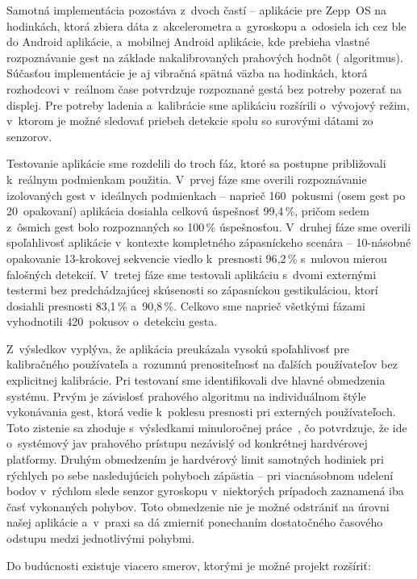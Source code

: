 Samotná implementácia pozostáva z~dvoch častí -- aplikácie
pre Zepp~OS na hodinkách, ktorá zbiera dáta z~akcelerometra
a~gyroskopu a~odosiela ich cez \Gls{ble} do Android
aplikácie, a~mobilnej Android aplikácie, kde prebieha
vlastné rozpoznávanie gest na základe nakalibrovaných
prahových hodnôt ( algoritmus). Súčasťou
implementácie je aj vibračná spätná väzba na hodinkách,
ktorá rozhodcovi v~reálnom čase potvrdzuje rozpoznané gestá
bez potreby pozerať na displej. Pre potreby ladenia
a~kalibrácie sme aplikáciu rozšírili o~vývojový režim,
v~ktorom je možné sledovať priebeh detekcie spolu so
surovými dátami zo senzorov.

Testovanie aplikácie sme rozdelili do troch fáz, ktoré sa
postupne približovali k~reálnym podmienkam použitia. V~prvej
fáze sme overili rozpoznávanie izolovaných gest v~ideálnych
podmienkach -- naprieč 160~pokusmi (osem gest po
20~opakovaní) aplikácia dosiahla celkovú úspešnosť 99,4\,\%,
pričom sedem z~ôsmich gest bolo rozpoznaných so 100\,\%
úspešnosťou. V~druhej fáze sme overili spoľahlivosť aplikácie
v~kontexte kompletného zápasníckeho scenára -- 10-násobné
opakovanie 13-krokovej sekvencie viedlo k~presnosti 96,2\,\%
s~nulovou mierou falošných detekcií. V~tretej fáze sme
testovali aplikáciu s~dvomi externými testermi bez
predchádzajúcej skúsenosti so zápasníckou gestikuláciou,
ktorí dosiahli presnosti 83,1\,\% a~90,8\,\%. Celkovo sme
naprieč všetkými fázami vyhodnotili 420~pokusov o~detekciu
gesta.

Z~výsledkov vyplýva, že aplikácia preukázala vysokú
spoľahlivosť pre kalibračného používateľa a~rozumnú
prenositeľnosť na ďalších používateľov bez explicitnej
kalibrácie. Pri testovaní sme identifikovali dve hlavné
obmedzenia systému. Prvým je závislosť prahového algoritmu
na individuálnom štýle vykonávania gest, ktorá vedie
k~poklesu presnosti pri externých používateľoch. Toto
zistenie sa zhoduje s~výsledkami minuloročnej
práce~\cite{dp-balla}, čo potvrdzuje, že ide o~systémový
jav prahového prístupu nezávislý od konkrétnej hardvérovej
platformy. Druhým obmedzením je hardvérový limit samotných
hodiniek pri rýchlych po sebe nasledujúcich pohyboch
zápästia -- pri viacnásobnom udelení bodov v~rýchlom slede
senzor gyroskopu v~niektorých prípadoch zaznamená iba časť
vykonaných pohybov. Toto obmedzenie nie je možné odstrániť
na úrovni našej aplikácie a~v~praxi sa dá zmierniť
ponechaním dostatočného časového odstupu medzi jednotlivými
pohybmi.

Do budúcnosti existuje viacero smerov, ktorými je možné
projekt rozšíriť:

